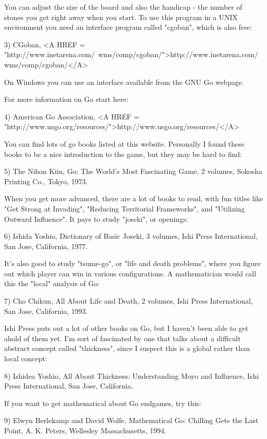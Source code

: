 You can adjust the size of the board and also the handicap - the number
of stones you get right away when you start.  To use this program in a
UNIX environment you need an interface program called
"cgoban", which is also free:

3) CGoban, <A HREF = "http://www.inetarena.com/~wms/comp/cgoban/">http://www.inetarena.com/~wms/comp/cgoban/</A>

On Windows you can use an interface available from the GNU Go webpage.

For more information on Go start here:

4) American Go Association, <A HREF = "http://www.usgo.org/resources/">http://www.usgo.org/resources/</A>

You can find lots of go books listed at this website.  Personally
I found these books to be a nice introduction to the game, but they
may be hard to find:

5) The Nihon Kiin, Go: The World's Most Fascinating Game, 2 volumes,
Sokosha Printing Co., Tokyo, 1973.

When you get more advanced, there are a lot of books to read, with 
fun titles like "Get Strong at Invading", "Reducing Territorial 
Frameworks", and "Utilizing Outward Influence".  It pays to study
"joseki", or openings:

6) Ishida Yoshio, Dictionary of Basic Joseki, 3 volumes, Ishi
Press International, San Jose, California, 1977.

It's also good to study "tsume-go", or "life and death problems", where
you figure out which player can win in various configurations.  A
mathematician would call this the "local" analysis of Go:

7) Cho Chikun, All About Life and Death, 2 volumes, Ishi Press 
International, San Jose, California, 1993.

Ishi Press puts out a lot of other books on Go, but I haven't been able
to get ahold of them yet.  I'm sort of fascinated by one that talks
about a difficult abstract concept called "thickness", since I suspect
this is a global rather than local concept:

8) Ishidea Yoshio, All About Thickness: Understanding Moyo and
Influence, Ishi Press International, San Jose, California.

If you want to get mathematical about Go endgames, try this:

9) Elwyn Berlekamp and David Wolfe, Mathematical Go: Chilling
Gets the Last Point, A. K. Peters, Wellesley Massachusetts, 1994.

